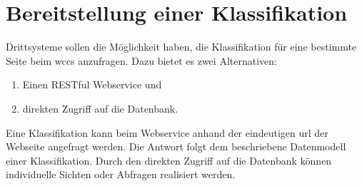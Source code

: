 \section{Bereitstellung einer Klassifikation}
    Drittsysteme sollen die Möglichkeit haben,
    die Klassifikation für eine bestimmte Seite beim \gls{wccs} anzufragen.
    Dazu bietet es zwei Alternativen:

    \begin{enumerate}
        \item Einen RESTful Webservice und
        \item direkten Zugriff auf die Datenbank.
    \end{enumerate}

    Eine Klassifikation kann beim Webservice anhand der eindeutigen \gls{url} der Webseite angefragt werden.
    Die Antwort folgt dem beschriebene Datenmodell einer
    Klassifikation.
    Durch den direkten Zugriff auf die Datenbank können
    individuelle Sichten oder Abfragen realisiert werden.
